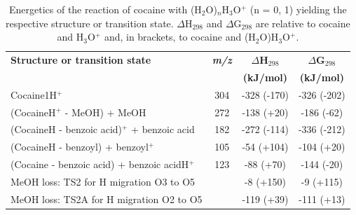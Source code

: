 \begin{table}[htbp]
\centering
\caption{Energetics of the reaction of cocaine with (H$_2$O)$_n$H$_3$O$^+$ (n = 0, 1) yielding the respective structure or transition state. $\Delta$H$_{298}$ and $\Delta$G$_{298}$ are relative to cocaine and H$_3$O$^+$ and, in brackets, to cocaine and (H$_2$O)H$_3$O$^+$.}
\label{tb:co2}
\begin{tabular}{lccc}
\toprule
\textbf{Structure or transition state}	&\textbf{\textit{m/z} } &\textbf{$\Delta$H$_{298}$} &\textbf{$\Delta$G$_{298}$}\\
& &	\textbf{(kJ/mol)} &\textbf{(kJ/mol)} \\  \toprule
Cocaine1H$^+$  				&	304	& -328 (-170)  & -326 (-202)   \\ \midrule
(CocaineH$^+$ - MeOH) + MeOH   			&	272	& -138 (+20)	&-186 (-62)   \\ \midrule
(CocaineH - benzoic acid)$^+$ + benzoic acid &	182 & -272 (-114)  & -336 (-212)  \\ \midrule
(CocaineH - benzoyl) + benzoyl$^+$    	&	105	& -54 (+104)  & -104 (+20)  \\ \midrule
(Cocaine - benzoic acid) + benzoic acidH$^+$& 123	& -88 (+70)  & -144  (-20) \\ \midrule
MeOH loss: TS2 for H migration O3 to O5& & -8 (+150)  & -9 (+115)  \\ \midrule
MeOH loss: TS2A for H migration O2 to O5& & -119 (+39)  & -111  (+13) \\ 
\bottomrule
\end{tabular}
\end{table}


